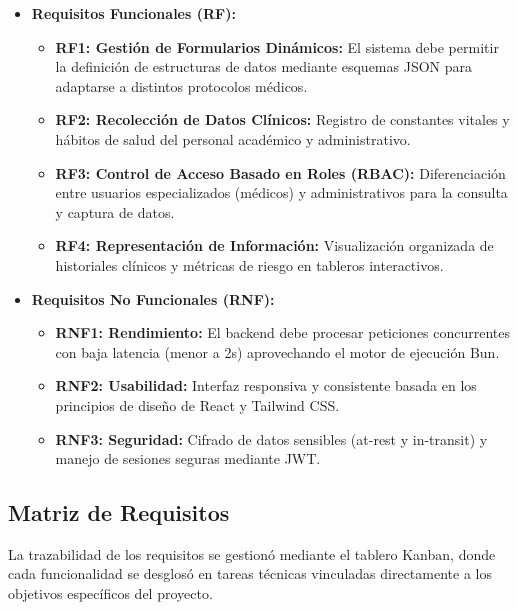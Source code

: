 \begin{itemize}
    \item \textbf{Requisitos Funcionales (RF):}
    \begin{itemize}
        \item \textbf{RF1: Gestión de Formularios Dinámicos:} El sistema debe permitir la definición de estructuras de datos mediante esquemas JSON para adaptarse a distintos protocolos médicos.
        \item \textbf{RF2: Recolección de Datos Clínicos:} Registro de constantes vitales y hábitos de salud del personal académico y administrativo.
        \item \textbf{RF3: Control de Acceso Basado en Roles (RBAC):} Diferenciación entre usuarios especializados (médicos) y administrativos para la consulta y captura de datos.
        \item \textbf{RF4: Representación de Información:} Visualización organizada de historiales clínicos y métricas de riesgo en tableros interactivos.
    \end{itemize}
    
    \item \textbf{Requisitos No Funcionales (RNF):}
    \begin{itemize}
        \item \textbf{RNF1: Rendimiento:} El backend debe procesar peticiones concurrentes con baja latencia (menor a 2s) aprovechando el motor de ejecución Bun.
        \item \textbf{RNF2: Usabilidad:} Interfaz responsiva y consistente basada en los principios de diseño de React y Tailwind CSS.
        \item \textbf{RNF3: Seguridad:} Cifrado de datos sensibles (at-rest y in-transit) y manejo de sesiones seguras mediante JWT.
    \end{itemize}
\end{itemize}

\subsection{Matriz de Requisitos}
La trazabilidad de los requisitos se gestionó mediante el tablero Kanban, donde cada funcionalidad se desglosó en tareas técnicas vinculadas directamente a los objetivos específicos del proyecto.

